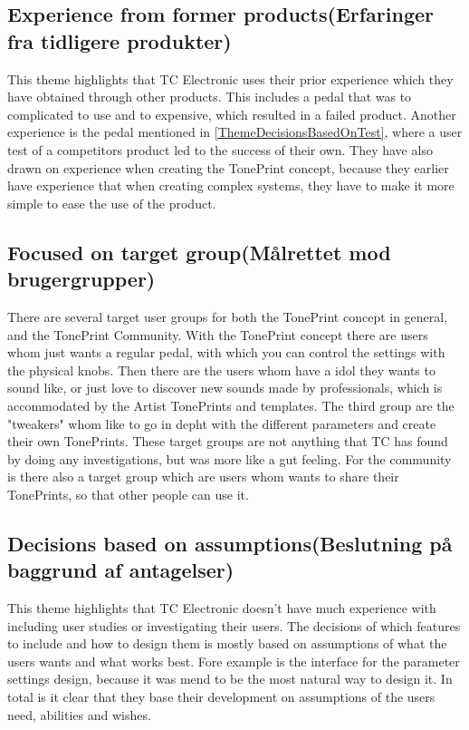  \subsection*{Experience from former products(Erfaringer fra tidligere produkter)}
 \label{ThemeExperienceFromFormerProducts}
 This theme highlights that TC Electronic uses their prior experience which they have obtained through other products. This includes a pedal that was to complicated to use and to expensive, which resulted in a failed product. Another experience is the pedal mentioned in \autoref{ThemeDecisionsBasedOnTest}, where a user test of a competitors product led to the success of their own. They have also drawn on experience when creating the TonePrint concept, because they earlier have experience that when creating complex systems, they have to make it more simple to ease the use of the product.
 
\subsection*{Focused on target group(Målrettet mod brugergrupper)}
\label{ThemeFocusedOnTargetGroup}
There are several target user groups for both the TonePrint concept in general, and the TonePrint Community. With the TonePrint concept there are users whom just wants a regular pedal, with which you can control the settings with the physical knobs. Then there are the users whom have a idol they wants to sound like, or just love to discover new sounds made by professionals, which is accommodated by the Artist TonePrints and templates. The third group are the "tweakers" whom like to go in depht with the different parameters and create their own TonePrints. These target groups are not anything that TC has found by doing any investigations, but was more like a gut feeling. For the community is there also a target group which are users whom wants to share their TonePrints, so that other people can use it.

\subsection*{Decisions based on assumptions(Beslutning på baggrund af antagelser)} 
\label{ThemeDecisionsBasedOnAssumptions}
This theme highlights that TC Electronic doesn't have much experience with including user studies or investigating their users. The decisions of which features to include and how to design them is mostly based on assumptions of what the users wants and what works best. Fore example is the interface for the parameter settings design, because it was mend to be the most natural way to design it. In total is it clear that they base their development on assumptions of the users need, abilities and wishes.


